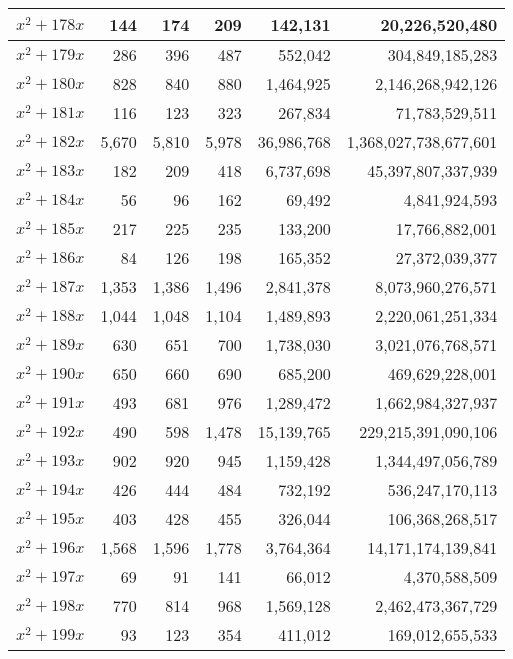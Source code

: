 \documentclass[a4paper]{amsproc}
\theoremstyle{plain}
\begin{document}
\begin{longtable}{ | l | r | r | r | r | r | }
$x^2 + 178x$ & 144 & 174 & 209 & 142{,}131 & 20{,}226{,}520{,}480 \\ \hline
$x^2 + 179x$ & 286 & 396 & 487 & 552{,}042 & 304{,}849{,}185{,}283 \\ \hline
$x^2 + 180x$ & 828 & 840 & 880 & 1{,}464{,}925 & 2{,}146{,}268{,}942{,}126 \\ \hline
$x^2 + 181x$ & 116 & 123 & 323 & 267{,}834 & 71{,}783{,}529{,}511 \\ \hline
$x^2 + 182x$ & 5{,}670 & 5{,}810 & 5{,}978 & 36{,}986{,}768 & 1{,}368{,}027{,}738{,}677{,}601 \\ \hline
$x^2 + 183x$ & 182 & 209 & 418 & 6{,}737{,}698 & 45{,}397{,}807{,}337{,}939 \\ \hline
$x^2 + 184x$ & 56 & 96 & 162 & 69{,}492 & 4{,}841{,}924{,}593 \\ \hline
$x^2 + 185x$ & 217 & 225 & 235 & 133{,}200 & 17{,}766{,}882{,}001 \\ \hline
$x^2 + 186x$ & 84 & 126 & 198 & 165{,}352 & 27{,}372{,}039{,}377 \\ \hline
$x^2 + 187x$ & 1{,}353 & 1{,}386 & 1{,}496 & 2{,}841{,}378 & 8{,}073{,}960{,}276{,}571 \\ \hline
$x^2 + 188x$ & 1{,}044 & 1{,}048 & 1{,}104 & 1{,}489{,}893 & 2{,}220{,}061{,}251{,}334 \\ \hline
$x^2 + 189x$ & 630 & 651 & 700 & 1{,}738{,}030 & 3{,}021{,}076{,}768{,}571 \\ \hline
$x^2 + 190x$ & 650 & 660 & 690 & 685{,}200 & 469{,}629{,}228{,}001 \\ \hline
$x^2 + 191x$ & 493 & 681 & 976 & 1{,}289{,}472 & 1{,}662{,}984{,}327{,}937 \\ \hline
$x^2 + 192x$ & 490 & 598 & 1{,}478 & 15{,}139{,}765 & 229{,}215{,}391{,}090{,}106 \\ \hline
$x^2 + 193x$ & 902 & 920 & 945 & 1{,}159{,}428 & 1{,}344{,}497{,}056{,}789 \\ \hline
$x^2 + 194x$ & 426 & 444 & 484 & 732{,}192 & 536{,}247{,}170{,}113 \\ \hline
$x^2 + 195x$ & 403 & 428 & 455 & 326{,}044 & 106{,}368{,}268{,}517 \\ \hline
$x^2 + 196x$ & 1{,}568 & 1{,}596 & 1{,}778 & 3{,}764{,}364 & 14{,}171{,}174{,}139{,}841 \\ \hline
$x^2 + 197x$ & 69 & 91 & 141 & 66{,}012 & 4{,}370{,}588{,}509 \\ \hline
$x^2 + 198x$ & 770 & 814 & 968 & 1{,}569{,}128 & 2{,}462{,}473{,}367{,}729 \\ \hline
$x^2 + 199x$ & 93 & 123 & 354 & 411{,}012 & 169{,}012{,}655{,}533 \\ \hline

\end{longtable}
\end{document}
